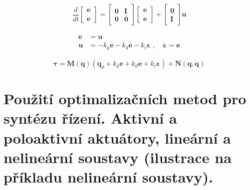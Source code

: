 \documentclass{article}
\begin{document}
	\begin{equation}
		\frac{d}{d t}
		\begin{bmatrix}
			\bm{e} \\
			\bm{\dot{e}}
		\end{bmatrix}
		=
		\begin{bmatrix}
			\bm{0} & \bm{I} \\
			\bm{0} & \bm{0}
		\end{bmatrix}
		\begin{bmatrix}
			\bm{e} \\
			\bm{\dot{e}}
		\end{bmatrix}
		+	
		\begin{bmatrix}
			\bm{0} \\
			\bm{I}
		\end{bmatrix}
		\bm{u}
	\end{equation}

	\begin{align}
		\bm{\ddot{e}} &= \bm{u} \\
		\bm{u} &= -k_p \bm{e} - k_d \bm{\dot{e}} - k_i \bm{\varepsilon}
		\;,\quad 
		\bm{\dot{\varepsilon}} = \bm{e} 
	\end{align}

	\begin{equation}
		\bm{\tau} = \bm{M}(\bm{q}) ( \bm{\ddot{q}}_d + k_p \bm{e} + k_d \bm{\dot{e}} + k_i \bm{\varepsilon} ) + \bm{N}(\bm{q},\bm{\dot{q}})
	\end{equation}

	\section{Použití optimalizačních metod pro syntézu řízení. Aktivní a poloaktivní aktuátory, lineární a nelineární soustavy (ilustrace na příkladu nelineární soustavy).}
\end{document}
